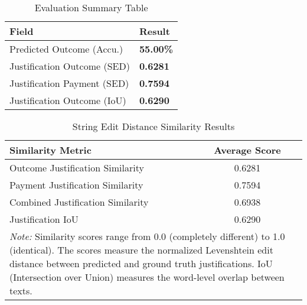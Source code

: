 
\begin{table}[H]
\centering
\caption{Evaluation Summary Table}
\label{tab:evaluation_summary}
\begin{tabular}{@{}lp{2cm}@{}}
\toprule
\textbf{Field} & \textbf{Result} \\
\midrule
Predicted Outcome (Accu.) & \textbf{55.00\%} \\
Justification Outcome (SED) &  \textbf{0.6281} \\
Justification Payment (SED) &  \textbf{0.7594} \\
Justification Outcome (IoU) &  \textbf{0.6290} \\
\bottomrule
\end{tabular}
\end{table}

\begin{table}[!ht]
\centering
\caption{String Edit Distance Similarity Results}
\label{tab:string_edit_distance_results}
\begin{tabular}{lc}
\toprule
\textbf{Similarity Metric} & \textbf{Average Score} \\
\midrule
Outcome Justification Similarity & 0.6281 \\
Payment Justification Similarity & 0.7594 \\
Combined Justification Similarity & 0.6938 \\
Justification IoU & 0.6290 \\
\midrule
\multicolumn{2}{p{13cm}}{\textit{Note:} Similarity scores range from 0.0 (completely different) to 1.0 (identical). 
The scores measure the normalized Levenshtein edit distance between predicted and ground truth justifications.
IoU (Intersection over Union) measures the word-level overlap between texts.} \\
\bottomrule
\end{tabular}
\end{table}

